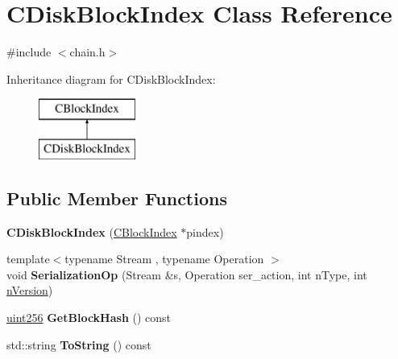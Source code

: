 \hypertarget{class_c_disk_block_index}{}\section{C\+Disk\+Block\+Index Class Reference}
\label{class_c_disk_block_index}


{\ttfamily \#include $<$chain.\+h$>$}

Inheritance diagram for C\+Disk\+Block\+Index\+:\begin{figure}[H]
\begin{center}
\leavevmode
\includegraphics[height=2.000000cm]{class_c_disk_block_index}
\end{center}
\end{figure}
\subsection*{Public Member Functions}
\begin{DoxyCompactItemize}
\item 
\mbox{\label{class_c_disk_block_index_a1407006c4526260b57ec2d8b3abc707d}} 
{\bfseries C\+Disk\+Block\+Index} (\mbox{\hyperlink{class_c_block_index}{C\+Block\+Index}} $\ast$pindex)
\item 
\mbox{\label{class_c_disk_block_index_a2ef7b51f2777fcc1b9625a0ee000f9b5}} 
{\footnotesize template$<$typename Stream , typename Operation $>$ }\\void {\bfseries Serialization\+Op} (Stream \&s, Operation ser\+\_\+action, int n\+Type, int \mbox{\hyperlink{class_c_block_index_a45126301a0a6e26010527a7bbfc1ef58}{n\+Version}})
\item 
\mbox{\label{class_c_disk_block_index_acc607a9082c558d7301077631b66122b}} 
\mbox{\hyperlink{classuint256}{uint256}} {\bfseries Get\+Block\+Hash} () const
\item 
\mbox{\label{class_c_disk_block_index_a347eafa0667f8641f73062b48c217d61}} 
std\+::string {\bfseries To\+String} () const
\end{DoxyCompactItemize}
